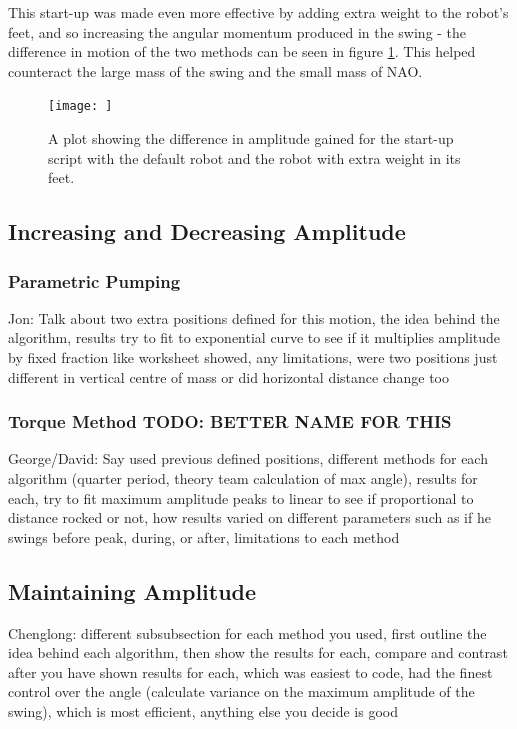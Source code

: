 \documentclass[11pt]{article}
\begin{document}
This start-up was made even more effective by adding extra weight to the robot's feet, and so increasing the angular momentum produced in the swing - the difference in motion of the two methods can be seen in figure \ref{fig:startupcomparison}. This helped counteract the large mass of the swing and the small mass of NAO.


    \begin{figure}
        \centering
        \texttt{[image: ]}
        \caption{A plot showing the difference in amplitude gained for the start-up script with the default robot and the robot with extra weight in its feet.}
        \label{fig:startupcomparison}
    \end{figure}



\subsection{Increasing and Decreasing Amplitude}
\subsubsection{Parametric Pumping}
Jon: Talk about two extra positions defined for this motion, the idea behind the algorithm, results try to fit to exponential curve to see if it multiplies amplitude by fixed fraction like worksheet showed, any limitations, were two positions just different in vertical centre of mass or did horizontal distance change too
\subsubsection{Torque Method TODO: BETTER NAME FOR THIS}
George/David: Say used previous defined positions, different methods for each algorithm (quarter period, theory team calculation of max angle), results for each, try to fit maximum amplitude peaks to linear to see if proportional to distance rocked or not, how results varied on different parameters such as if he swings before peak, during, or after, limitations to each method

\subsection{Maintaining Amplitude}
Chenglong: different subsubsection for each method you used, first outline the idea behind each algorithm, then show the results for each, compare and contrast after you have shown results for each, which was easiest to code, had the finest control over the angle (calculate variance on the maximum amplitude of the swing), which is most efficient, anything else you decide is good
\end{document}
